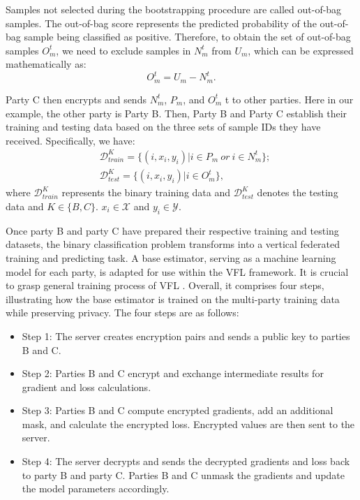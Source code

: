 \documentclass[10pt,journal,compsoc]{IEEEtran}
\begin{document}
\begin{enumerate}[label=(\arabic*)]
	Samples not selected during the bootstrapping procedure are called out-of-bag samples. The out-of-bag score represents the predicted probability of the out-of-bag sample being classified as positive. Therefore, to obtain the set of out-of-bag samples $O_{m}^{t}$, we need to exclude samples in $N_{m}^{t}$ from ${{U}_{m}}$, which can be expressed mathematically as:
	\begin{equation}
		O_{m}^{t}={{U}_{m}}-N_{m}^{t}.
	\end{equation}
	
	Party C then encrypts and sends   $N_{m}^{t}$,  ${{P}_{m}}$, and $O_{m}^{t}$ t to other parties. Here in our example, the other party is Party B. Then, Party B and Party C establish their training and testing data based on the three sets of sample IDs they have received. Specifically, we have:
	\begin{equation}
		\begin{split}
			&\mathsf{\mathcal{D}}_{train}^{K}=\{(i,{{x}_{i}},{{y}_{i}})|i\in {{P}_{m}}\ or\ i\in N_{m}^{t}\};\\
			&\mathsf{\mathcal{D}}_{test}^{K}=\{(i,{{x}_{i}},{{y}_{i}})|i\in O_{m}^{t}\},
		\end{split}
	\end{equation}
	where $\mathsf{\mathcal{D}}_{train}^{K}$ represents the binary training data and $\mathsf{\mathcal{D}}_{test}^{K}$ denotes the testing data and $K\in \{B,C\}$. ${{x}_{i}}\in \mathsf{\mathcal{X}}$ and ${{y}_{i}}\in \mathsf{\mathcal{Y}}$.
	
	
	Once party B and party C have prepared their respective training and testing datasets, the binary classification problem transforms into a vertical federated training and predicting task. A base estimator, serving as a machine learning model for each party, is adapted for use within the VFL framework. It is crucial to grasp general training process of VFL \cite{yang2019federated}. Overall, it comprises four steps, illustrating how the base estimator is trained on the multi-party training data while preserving privacy. The four steps are as follows:
	\begin{itemize}
		\item Step 1: The server creates encryption pairs and sends a public key to parties B and C.
		\item Step 2: Parties B and C encrypt and exchange intermediate results for gradient and loss calculations.
		\item Step 3: Parties B and C compute encrypted gradients, add an additional mask, and calculate the encrypted loss. Encrypted values are then sent to the server.
		\item Step 4: The server decrypts and sends the decrypted gradients and loss back to party B and party C. Parties B and C unmask the gradients and update the model parameters accordingly.
	\end{itemize}
	

\end{enumerate}
\end{document}
